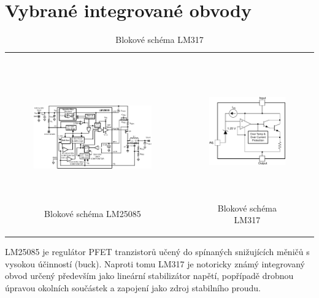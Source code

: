 \section{Vybrané integrované obvody}

\begin{table}[H]
	\begin{center}

		\begin{tabular}{cc}
			\begin{minipage}{0.5\textwidth}
				\begin{figure}[H]
					\centering
					\includegraphics[height=5.9cm]{img/LM25085.pdf}
					\caption{Blokové schéma LM25085}
					\label{graf:1}
				\end{figure}
			\end{minipage}

	&		
				
			\begin{minipage}{0.5\textwidth}
				\begin{figure}[H]
					\centering
					\includegraphics[height=5.9cm]{img/LM317.pdf}
					\caption{Blokové schéma LM317}
					\label{graf:1}
				\end{figure}
			\end{minipage}
		\end{tabular}
	\end{center}	
\end{table}

LM25085 je regulátor PFET tranzistorů učený do spínaných snižujících měničů s vysokou účinností (buck). Naproti tomu LM317 je notoricky známý integrovaný obvod určený především jako lineární stabilizátor napětí, popřípadě drobnou úpravou okolních součástek a zapojení jako zdroj stabilního proudu.